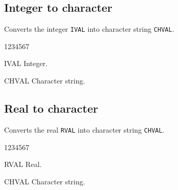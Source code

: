 \subsection{Integer to character}
\Action
Converts the integer {\tt IVAL} into character string {\tt CHVAL}.
\Pdesc
\begin{DLtt}{1234567}
\item[IVAL] Integer.
\item[CHVAL] Character string.
\end{DLtt}
\subsection{Real to character}
\Action
Converts the real {\tt RVAL} into character string {\tt CHVAL}.
\Pdesc
\begin{DLtt}{1234567}
\item[RVAL] Real.
\item[CHVAL] Character string.
\end{DLtt}
